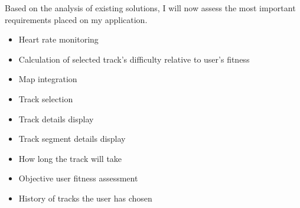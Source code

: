 \linebreak
Based on the analysis of existing solutions, I will now assess the most important requirements placed on my application.

\begin{itemize}
    \item Heart rate monitoring
    \item Calculation of selected track's difficulty relative to user's fitness
    \item Map integration
    \item Track selection
    \item Track details display
    \item Track segment details display
    \item How long the track will take 
    \item Objective user fitness assessment
    \item History of tracks the user has chosen
\end{itemize}